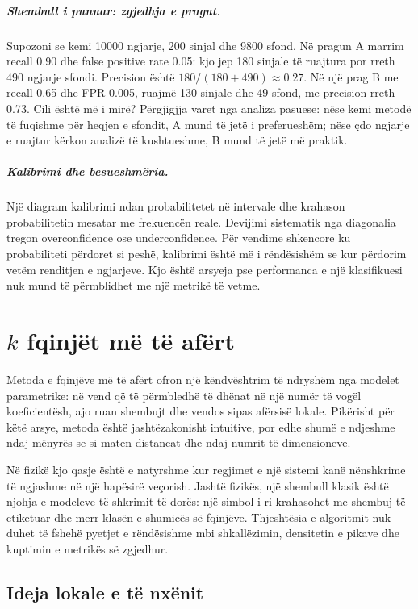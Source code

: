 \documentclass[12pt,a4paper,oneside]{book}
\begin{document}
\paragraph{Shembull i punuar: zgjedhja e pragut.}
Supozoni se kemi 10000 ngjarje, 200 sinjal dhe 9800 sfond. Në pragun A marrim recall 0.90 dhe false positive rate 0.05: kjo jep 180 sinjale të ruajtura por rreth 490 ngjarje sfondi. Precision është $180/(180+490)\approx0.27$. Në një prag B me recall 0.65 dhe FPR 0.005, ruajmë 130 sinjale dhe 49 sfond, me precision rreth 0.73. Cili është më i mirë? Përgjigjja varet nga analiza pasuese: nëse kemi metodë të fuqishme për heqjen e sfondit, A mund të jetë i preferueshëm; nëse çdo ngjarje e ruajtur kërkon analizë të kushtueshme, B mund të jetë më praktik.

\paragraph{Kalibrimi dhe besueshmëria.}
Një diagram kalibrimi ndan probabilitetet në intervale dhe krahason probabilitetin mesatar me frekuencën reale. Devijimi sistematik nga diagonalia tregon overconfidence ose underconfidence. Për vendime shkencore ku probabiliteti përdoret si peshë, kalibrimi është më i rëndësishëm se kur përdorim vetëm renditjen e ngjarjeve. Kjo është arsyeja pse performanca e një klasifikuesi nuk mund të përmblidhet me një metrikë të vetme.

\chapter[k-NN]{$k$ fqinjët më të afërt}

Metoda e fqinjëve më të afërt ofron një këndvështrim të ndryshëm nga modelet parametrike: në vend që të përmbledhë të dhënat në një numër të vogël koeficientësh, ajo ruan shembujt dhe vendos sipas afërsisë lokale. Pikërisht për këtë arsye, metoda është jashtëzakonisht intuitive, por edhe shumë e ndjeshme ndaj mënyrës se si maten distancat dhe ndaj numrit të dimensioneve.

Në fizikë kjo qasje është e natyrshme kur regjimet e një sistemi kanë nënshkrime të ngjashme në një hapësirë veçorish. Jashtë fizikës, një shembull klasik është njohja e modeleve të shkrimit të dorës: një simbol i ri krahasohet me shembuj të etiketuar dhe merr klasën e shumicës së fqinjëve. Thjeshtësia e algoritmit nuk duhet të fshehë pyetjet e rëndësishme mbi shkallëzimin, densitetin e pikave dhe kuptimin e metrikës së zgjedhur.
\section{Ideja lokale e të nxënit}
\end{document}

